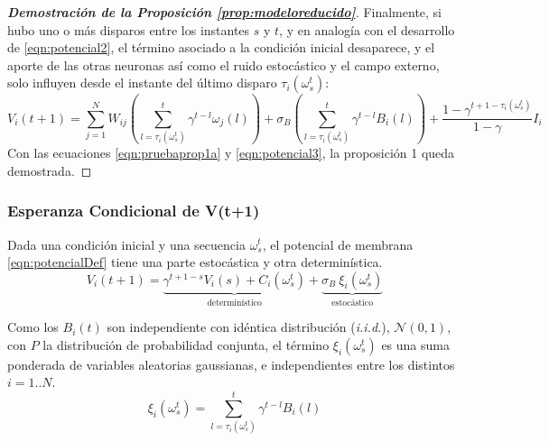 \begin{proof}[\bf{Demostración de la Proposición \ref{prop:modeloreducido}}]
Finalmente, si hubo uno o más disparos entre los instantes $s$ y $t$, y en analogía con el desarrollo de \eqref{eqn:potencial2}, el término asociado a la condición inicial desaparece, y el aporte de las otras neuronas así como el ruido estocástico y el campo externo, solo influyen desde el instante del último disparo $\tau_i(\omega^t_s)$:
\begin{equation}
     V_i(t+1) = \sum_{j=1}^N W_{ij} \left(\sum_{l=\tau_i(\omega_s^t)}^t \gamma^{t-l}\omega_j(l) \right) + \sigma_B \left(\sum_{l=\tau_i(\omega_s^t)}^t \gamma^{t-l} B_i(l) \right) +\frac{1-\gamma^{t+1-\tau_i(\omega_s^t)}}{1-\gamma} I_i
     \label{eqn:potencial3}
\end{equation}
Con las ecuaciones \eqref{eqn:pruebaprop1a} y \eqref{eqn:potencial3}, la proposición 1 queda demostrada.
\end{proof}

\subsubsection{Esperanza Condicional de V(t+1)}

Dada una condición inicial y una secuencia $\omega_s^t$, el potencial de membrana \eqref{eqn:potencialDef} tiene una parte estocástica y otra determinística.
\begin{equation}
  V_i(t+1) = \underbrace{\gamma^{t+1-s} V_i(s) + C_i(\omega_s^t)}_{\text{determinístico}} + \underbrace{\sigma_B \  \xi_i(\omega_s^t)}_{\text{estocástico}}
  \label{eqn:potencialCompacto}
\end{equation}

Como los $B_i(t)$ son independiente con idéntica distribución (\emph{i.i.d.}), $\mathcal{N}(0,1)$, con $P$ la distribución de probabilidad conjunta, el término $ \xi_i(\omega_s^t)$ es una suma ponderada de variables aleatorias gaussianas, e independientes entre los distintos $i=1..N$.
\begin{equation}
\xi_i(\omega_s^t) = \sum_{l=\tau_i(\omega_s^t)}^t \gamma^{t-l} B_i(l)
\label{eqn:xi1}
\end{equation}

